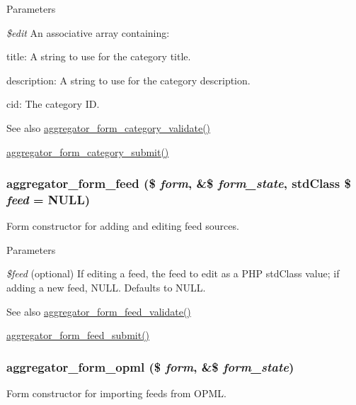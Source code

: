 \begin{DoxyParams}{Parameters}
\item[{\em \$edit}]An associative array containing:
\begin{DoxyItemize}
\item title: A string to use for the category title.
\item description: A string to use for the category description.
\item cid: The category ID.
\end{DoxyItemize}\end{DoxyParams}
\begin{DoxySeeAlso}{See also}
\hyperlink{aggregator_8admin_8inc_a419c55e35895dea1f41d5b31908883d5}{aggregator\_\-form\_\-category\_\-validate()} 

\hyperlink{aggregator_8admin_8inc_a56c1cadf416d17bd8dd8a53cc6ed5aeb}{aggregator\_\-form\_\-category\_\-submit()} 
\end{DoxySeeAlso}
\hypertarget{group__forms_ga6c746c1b1d0d29d1564f215cd1fe69e3}{
\subsubsection[{aggregator\_\-form\_\-feed}]{\setlength{\rightskip}{0pt plus 5cm}aggregator\_\-form\_\-feed (\$ {\em form}, \/  \&\$ {\em form\_\-state}, \/  stdClass \$ {\em feed} = {\ttfamily NULL})}}
\label{group__forms_ga6c746c1b1d0d29d1564f215cd1fe69e3}
Form constructor for adding and editing feed sources.


\begin{DoxyParams}{Parameters}
\item[{\em \$feed}](optional) If editing a feed, the feed to edit as a PHP stdClass value; if adding a new feed, NULL. Defaults to NULL.\end{DoxyParams}
\begin{DoxySeeAlso}{See also}
\hyperlink{aggregator_8admin_8inc_a4a4b42f6a1e73d72fb1e55c0f20fcf02}{aggregator\_\-form\_\-feed\_\-validate()} 

\hyperlink{aggregator_8admin_8inc_af98f428f07034e19622342875fe30984}{aggregator\_\-form\_\-feed\_\-submit()} 
\end{DoxySeeAlso}
\hypertarget{group__forms_gaf23a2363758db071378145309e4ee993}{
\subsubsection[{aggregator\_\-form\_\-opml}]{\setlength{\rightskip}{0pt plus 5cm}aggregator\_\-form\_\-opml (\$ {\em form}, \/  \&\$ {\em form\_\-state})}}
\label{group__forms_gaf23a2363758db071378145309e4ee993}
Form constructor for importing feeds from OPML.

